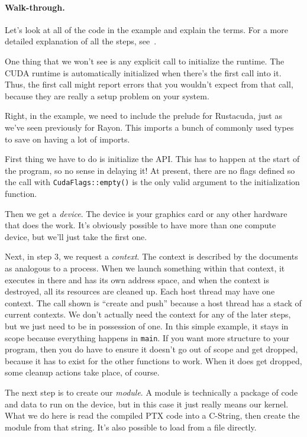 \documentclass[a4paper]{report}
\begin{document}
\paragraph{Walk-through.} Let's look at all of the code in the example and
explain the terms. For a more detailed explanation of all the steps, see~\cite{cuda}.

One thing that we won't see is any explicit call to initialize the runtime. The CUDA runtime is automatically initialized when there's the first call into it. Thus, the first call might report errors that you wouldn't expect from that call, because they are really a setup problem on your system.

Right, in the example, we need to include the prelude for Rustacuda, just as we've seen previously for Rayon. This imports a bunch of commonly used types to save on having a lot of imports. 

First thing we have to do is initialize the API. This has to happen at the start of the program, so no sense in delaying it! At present, there are no flags defined so the call with \texttt{CudaFlags::empty()} is the only valid argument to the initialization function. 

Then we get a \textit{device}. The device is your graphics card or any other hardware that does the work. It's obviously possible to have more than one compute device, but we'll just take the first one. 

Next, in step 3, we request a \emph{context}. The context is described by the documents as analogous to a process. When we launch something within that context, it executes in there and has its own address space, and when the context is destroyed, all its resources are cleaned up. Each host thread may have one context. The call shown is ``create and push'' because a host thread has a stack of current contexts. We don't actually need the context for any of the later steps, but we just need to be in possession of one. In this simple example, it stays in scope because everything happens in \texttt{main}. If you want more structure to your program, then you do have to ensure it doesn't go out of scope and get dropped, because it has to exist for the other functions to work. When it does get dropped, some cleanup actions take place, of course.

The next step is to create our \textit{module}. A module is technically a package of code and data to run on the device, but in this case it just really means our kernel. What we do here is read the compiled PTX code into a C-String, then create the module from that string. It's also possible to load from a file directly. 
\end{document}
